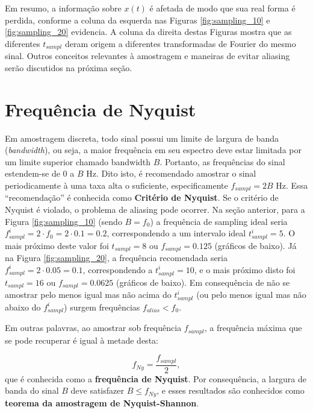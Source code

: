 Em resumo, a informação sobre $x(t)$ é afetada de modo que sua real forma é perdida, conforme a coluna da esquerda nas Figuras \ref{fig:sampling_10} e \ref{fig:sampling_20} evidencia. A coluna da direita destas Figuras mostra que as diferentes $t_{sampl}$ deram origem a diferentes transformadas de Fourier do mesmo sinal. Outros conceitos relevantes à amostragem e maneiras de evitar aliasing serão discutidos na próxima seção.


\section{Frequência de Nyquist}

Em amostragem discreta, todo sinal possui um limite de largura de banda (\textit{bandwidth}), ou seja, a maior frequência em seu espectro deve estar limitada por um limite superior chamado bandwidth $B$. Portanto, as frequências do sinal estendem-se de 0 a $B$ Hz. Dito isto, é recomendado amostrar o sinal periodicamente à uma taxa alta o suficiente, especificamente $f_{sampl} = 2B$ Hz. Essa ``recomendação'' é conhecida como \textbf{Critério de Nyquist}. Se o critério de Nyquist é violado, o problema de aliasing pode ocorrer. Na seção anterior, para a Figura \ref{fig:sampling_10} (sendo $B = f_{0}$) a frequência de sampling ideal seria $f_{sampl}^{i} = 2 \cdot f_{0} = 2 \cdot 0.1 = 0.2$, correspondendo a um intervalo ideal $t_{sampl}^{i} = 5$. O mais próximo deste valor foi $t_{sampl} = 8$ ou $f_{sampl} = 0.125$ (gráficos de baixo). Já na Figura \ref{fig:sampling_20}, a frequência recomendada seria  $f_{sampl}^{i} = 2 \cdot 0.05 = 0.1$, correspondendo a $t_{sampl}^{i} = 10$, e o mais próximo disto foi $t_{sampl} = 16$ ou $f_{sampl} = 0.0625$ (gráficos de baixo). Em consequência de não se amostrar pelo menos igual mas não acima do $t_{sampl}^{i}$ (ou pelo menos igual mas não abaixo do $f_{sampl}^{i}$) surgem frequências $f_{alias} < f_{0}$.%

Em outras palavras, ao amostrar sob frequência $f_{sampl}$, a frequência máxima que se pode recuperar é igual à metade desta:

\begin{equation}
f_{Ny} = \frac{f_{sampl}}{2},
\end{equation}
que é conhecida como a \textbf{frequência de Nyquist}. Por consequência, a largura de banda do sinal $B$ deve satisfazer $B \leq f_{Ny}$, e esses resultados são conhecidos como \textbf{teorema da amostragem de Nyquist-Shannon}. %


